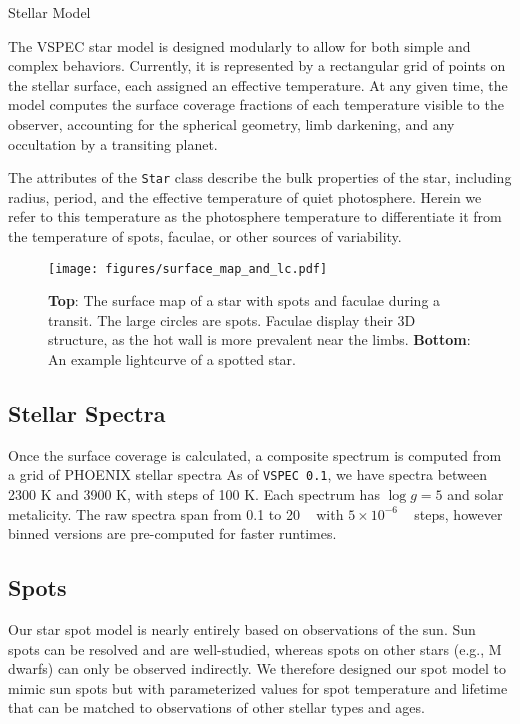 \documentclass[twocolumn]{aastex631}
\begin{document}
{Stellar Model \label{sec:star}}

The {\sc VSPEC} star model is designed modularly to allow
for both simple and complex behaviors. Currently, it
is represented by a rectangular grid of points on the stellar surface,
each assigned an effective temperature. At any given time, the model computes
the surface coverage fractions of each temperature visible to the observer, accounting for the
spherical geometry, limb darkening, and any occultation by a transiting planet.

The attributes of the \texttt{Star} class describe the bulk properties of the star, including radius,
period, and the effective temperature of quiet photosphere. Herein we refer to this temperature as the
photosphere temperature to differentiate it from the temperature of spots, faculae, or other sources of variability.

\begin{figure}
    \centering
        \texttt{[image: figures/surface\_map\_and\_lc.pdf]}
    \caption{{\bf Top}: The surface map of a star with spots and faculae during a transit.
    The large circles are spots. Faculae display their 3D structure, as the hot wall is more prevalent near the limbs.
    {\bf Bottom}: An example lightcurve of a spotted star.}
    \label{fig:surface_map}
\end{figure}

\subsection{Stellar Spectra \label{subsec:spectra}}
Once the surface coverage is calculated, a composite spectrum is computed from a grid of PHOENIX stellar spectra
\citep{husser2013} As of \texttt{VSPEC 0.1}, we have spectra between 2300 K and 3900 K, with steps of
100 K. Each spectrum has $\log{g} = 5$ and solar metalicity.
The raw spectra span from 0.1 to 20 \micron~ with $5 \times 10^{-6}$ \micron~ steps, however binned
versions are pre-computed for faster runtimes.

\subsection{Spots \label{subsec:spots}}
Our star spot model is nearly entirely based on observations of the sun. Sun spots can be resolved and are well-studied,
whereas spots on other stars (e.g., M dwarfs) can only be observed indirectly. We therefore designed our spot model to mimic
sun spots but with parameterized values for spot temperature and lifetime that can be matched to observations of other stellar types and ages.
\end{document}
